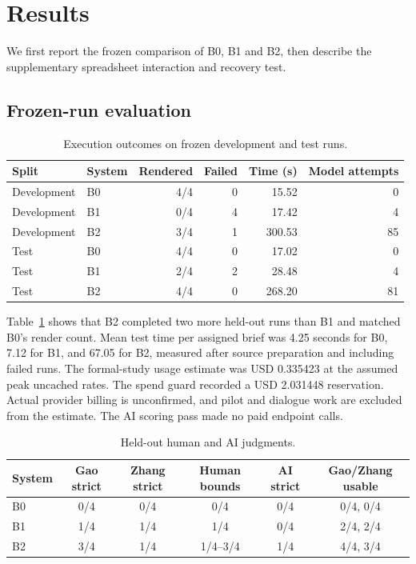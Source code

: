 \section{Results}
\label{sec:results}
We first report the frozen comparison of B0, B1 and B2, then describe the supplementary spreadsheet interaction and recovery test.

\subsection{Frozen-run evaluation}
\label{sec:frozen-results}
\begin{table}[htbp]
\centering
\caption{Execution outcomes on frozen development and test runs.}
\label{tab:execution}
\begin{tabular*}{\linewidth}{@{\extracolsep{\fill}}llrrrr}
\toprule
Split & System & Rendered & Failed & Time (s) & Model attempts \\
\midrule
Development & B0 & 4/4 & 0 & 15.52 & 0 \\
Development & B1 & 0/4 & 4 & 17.42 & 4 \\
Development & B2 & 3/4 & 1 & 300.53 & 85 \\
Test & B0 & 4/4 & 0 & 17.02 & 0 \\
Test & B1 & 2/4 & 2 & 28.48 & 4 \\
Test & B2 & 4/4 & 0 & 268.20 & 81 \\
\bottomrule
\end{tabular*}
\end{table}

Table~\ref{tab:execution} shows that B2 completed two more held-out runs than B1 and matched B0's render count. Mean test time per assigned brief was 4.25 seconds for B0, 7.12 for B1, and 67.05 for B2, measured after source preparation and including failed runs. The formal-study usage estimate was USD 0.335423 at the assumed peak uncached rates. The spend guard recorded a USD 2.031448 reservation. Actual provider billing is unconfirmed, and pilot and dialogue work are excluded from the estimate. The AI scoring pass made no paid endpoint calls.

\begin{table}[htbp]
\centering
\caption{Held-out human and AI judgments.}
\label{tab:human-ai}
\begin{tabular*}{\linewidth}{@{\extracolsep{\fill}}lccccc}
\toprule
System & Gao strict & Zhang strict & Human bounds & AI strict & Gao/Zhang usable \\
\midrule
B0 & 0/4 & 0/4 & 0/4 & 0/4 & 0/4, 0/4 \\
B1 & 1/4 & 1/4 & 1/4 & 0/4 & 2/4, 2/4 \\
B2 & 3/4 & 1/4 & 1/4--3/4 & 1/4 & 4/4, 3/4 \\
\bottomrule
\end{tabular*}
\end{table}

